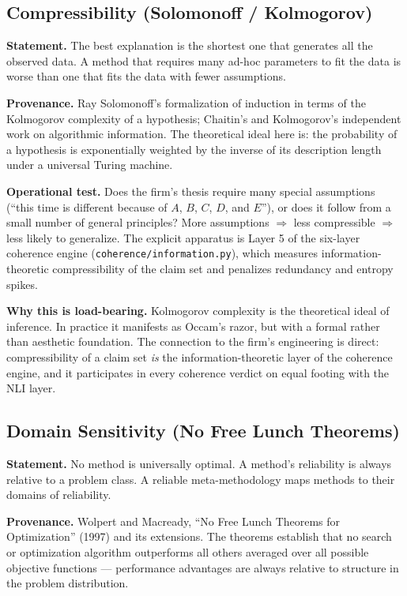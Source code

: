 \documentclass[11pt,letterpaper]{article}
\newcommand{\file}[1]{\texttt{#1}}
\begin{document}
\subsection{Compressibility (Solomonoff / Kolmogorov)}

\textbf{Statement.} The best explanation is the shortest one that generates all the observed data. A method that requires many ad-hoc parameters to fit the data is worse than one that fits the data with fewer assumptions.

\textbf{Provenance.} Ray Solomonoff's formalization of induction in terms of the Kolmogorov complexity of a hypothesis; Chaitin's and Kolmogorov's independent work on algorithmic information. The theoretical ideal here is: the probability of a hypothesis is exponentially weighted by the inverse of its description length under a universal Turing machine.

\textbf{Operational test.} Does the firm's thesis require many special assumptions (``this time is different because of $A$, $B$, $C$, $D$, and $E$''), or does it follow from a small number of general principles? More assumptions $\Rightarrow$ less compressible $\Rightarrow$ less likely to generalize. The explicit apparatus is Layer 5 of the six-layer coherence engine (\file{coherence/information.py}), which measures information-theoretic compressibility of the claim set and penalizes redundancy and entropy spikes.

\textbf{Why this is load-bearing.} Kolmogorov complexity is the theoretical ideal of inference. In practice it manifests as Occam's razor, but with a formal rather than aesthetic foundation. The connection to the firm's engineering is direct: compressibility of a claim set \emph{is} the information-theoretic layer of the coherence engine, and it participates in every coherence verdict on equal footing with the NLI layer.

\subsection{Domain Sensitivity (No Free Lunch Theorems)}

\textbf{Statement.} No method is universally optimal. A method's reliability is always relative to a problem class. A reliable meta-methodology maps methods to their domains of reliability.

\textbf{Provenance.} Wolpert and Macready, ``No Free Lunch Theorems for Optimization'' (1997) and its extensions. The theorems establish that no search or optimization algorithm outperforms all others averaged over all possible objective functions --- performance advantages are always relative to structure in the problem distribution.
\end{document}
